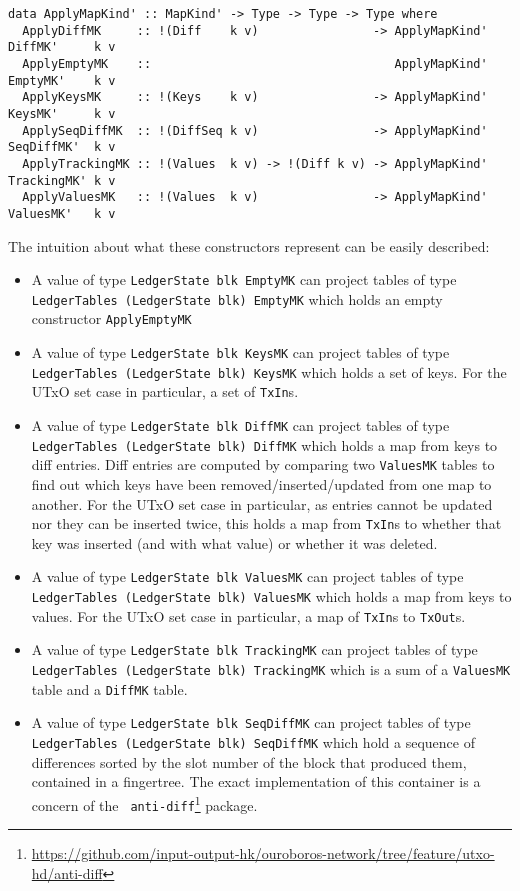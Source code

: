 \documentclass[11pt,a4paper]{article}
\newcommand{\htt}[1]{\texttt{#1}}
\theoremstyle{definition}
\begin{document}
\begin{verbatim}
data ApplyMapKind' :: MapKind' -> Type -> Type -> Type where
  ApplyDiffMK     :: !(Diff    k v)                -> ApplyMapKind' DiffMK'     k v
  ApplyEmptyMK    ::                                  ApplyMapKind' EmptyMK'    k v
  ApplyKeysMK     :: !(Keys    k v)                -> ApplyMapKind' KeysMK'     k v
  ApplySeqDiffMK  :: !(DiffSeq k v)                -> ApplyMapKind' SeqDiffMK'  k v
  ApplyTrackingMK :: !(Values  k v) -> !(Diff k v) -> ApplyMapKind' TrackingMK' k v
  ApplyValuesMK   :: !(Values  k v)                -> ApplyMapKind' ValuesMK'   k v
\end{verbatim}

The intuition about what these constructors represent can be easily described:

\begin{itemize}
  \item A value of type \htt{LedgerState blk EmptyMK} can project tables of
        type \htt{LedgerTables (LedgerState blk) EmptyMK} which holds an
        empty constructor \htt{ApplyEmptyMK}
  \item A value of type \htt{LedgerState blk KeysMK} can project tables of
        type \htt{LedgerTables (LedgerState blk) KeysMK} which holds a set of
        keys. For the UTxO set case in particular, a set of \htt{TxIn}s.
  \item A value of type \htt{LedgerState blk DiffMK} can project tables of
        type \htt{LedgerTables (LedgerState blk) DiffMK} which holds a map
        from keys to diff entries. Diff entries are computed by comparing two
        \htt{ValuesMK} tables to find out which keys have been
        removed/inserted/updated from one map to another. For the UTxO set case
        in particular, as entries cannot be updated nor they can be inserted
        twice, this holds a map from \htt{TxIn}s to whether that key was
        inserted (and with what value) or whether it was deleted.
  \item A value of type \htt{LedgerState blk ValuesMK} can project tables of
        type \htt{LedgerTables (LedgerState blk) ValuesMK} which holds a map
        from keys to values. For the UTxO set case in particular, a map of
        \htt{TxIn}s to \htt{TxOut}s.
  \item A value of type \htt{LedgerState blk TrackingMK} can project tables
        of type \htt{LedgerTables (LedgerState blk) TrackingMK} which is a
        sum of a \htt{ValuesMK} table and a \htt{DiffMK} table.
  \item A value of type \htt{LedgerState blk SeqDiffMK} can project tables of
        type \htt{LedgerTables (LedgerState blk) SeqDiffMK} which hold a
        sequence of differences sorted by the slot number of the block that
        produced them, contained in a fingertree. The exact implementation of
        this container is a concern of the {\tt
        anti-diff}\footnote{\href{https://github.com/input-output-hk/ouroboros-network/tree/feature/utxo-hd/anti-diff}{https://github.com/input-output-hk/ouroboros-network/tree/feature/utxo-hd/anti-diff}}
        package.
\end{itemize}
\end{document}
